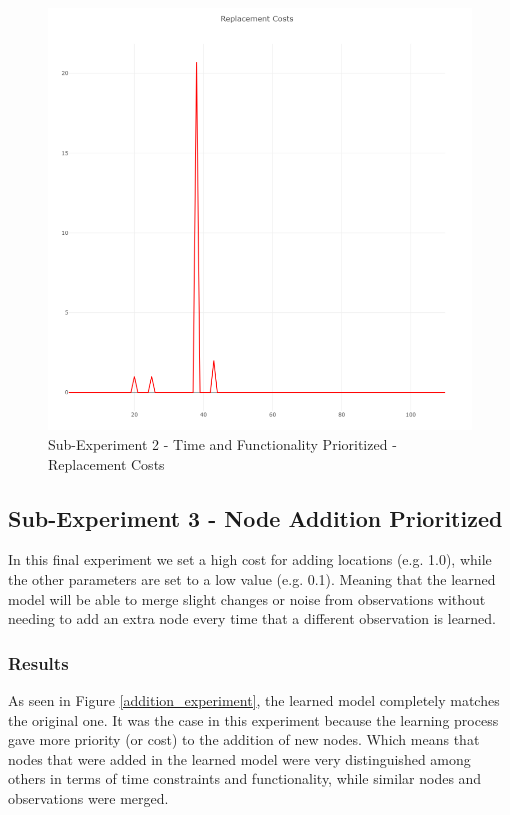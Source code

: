 %
\newpage
%
\begin{figure}[h]
	\centering
	\includegraphics[scale=0.5]{./pictures/time_functionality_experiment/replacement.png}
	\caption{Sub-Experiment 2 - Time and Functionality Prioritized - Replacement Costs}
	\label{time_func_experiment_rep}
\end{figure}

\subsection{Sub-Experiment 3 - Node Addition Prioritized}
In this final experiment we set a high cost for adding locations (e.g. 1.0), while the other parameters are set to a low value (e.g. 0.1). Meaning that the learned model will be able to merge slight changes or noise from observations without needing to add an extra node every time that a different observation is learned. 

\subsubsection{Results}
As seen in Figure \ref{addition_experiment}, the learned model completely matches the original one. It was the case in this experiment because the learning process gave more priority (or cost) to the addition of new nodes. Which means that nodes that were added in the learned model were very distinguished among others in terms of time constraints and functionality, while similar nodes and observations were merged. 

